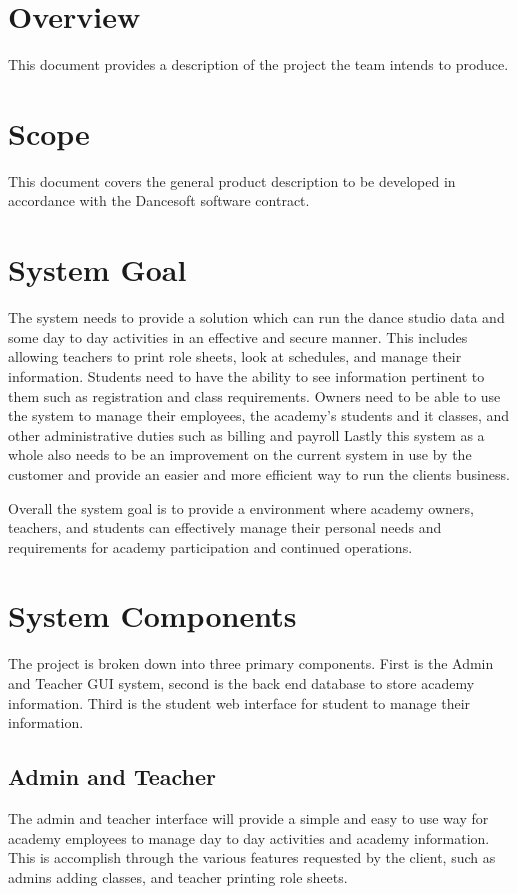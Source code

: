 \section{Overview}
This document provides a description of the project the team intends to produce.

\section{Scope}
This document covers the general product description to be developed in accordance with the Dancesoft software contract.

\section{System Goal}
The system needs to provide a solution which can run the dance studio data and some day to day activities in an effective and secure manner. This includes allowing teachers to print role sheets, look at schedules, and manage their information. Students need to have the ability to see information pertinent to them such as registration and class requirements. Owners need to be able to use the system to manage their employees, the academy's students and it classes, and other administrative duties such as billing and payroll  Lastly this system as a whole also needs to be an improvement on the current system in use by the customer and provide an easier and more efficient way to run the clients business.

Overall the system goal is to provide a environment where academy owners, teachers, and students can effectively manage their personal needs and requirements for academy participation and continued operations.

\section{System Components}
The project is broken down into three primary components. First is the Admin and Teacher GUI system, second is the back end database to store academy information. Third is the student web interface for student to manage their information.

\subsection{Admin and Teacher}
The admin and teacher interface will provide a simple and easy to use way for academy employees to manage day to day activities and academy information. This is accomplish through the various features requested by the client, such as admins adding classes, and teacher printing role sheets.

